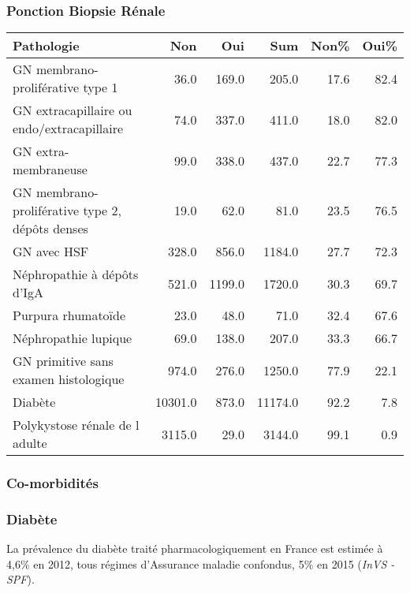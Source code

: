 \documentclass[11pt,a4paper]{article}\usepackage[]{graphicx}\usepackage[]{color}
\begin{document}
      \subsubsection{Ponction Biopsie Rénale}

\begin{table}[H]
\centering
\begin{tabular}{lrrrrr}
  \hline
Pathologie & Non & Oui & Sum & Non\% & Oui\% \\ 
  \hline
GN membrano-proliférative type 1 & 36.0 & 169.0 & 205.0 & 17.6 & 82.4 \\ 
  GN extracapillaire ou endo/extracapillaire & 74.0 & 337.0 & 411.0 & 18.0 & 82.0 \\ 
  GN extra-membraneuse & 99.0 & 338.0 & 437.0 & 22.7 & 77.3 \\ 
  GN membrano-proliférative type 2, dépôts denses & 19.0 & 62.0 & 81.0 & 23.5 & 76.5 \\ 
  GN avec HSF & 328.0 & 856.0 & 1184.0 & 27.7 & 72.3 \\ 
  Néphropathie à dépôts d'IgA & 521.0 & 1199.0 & 1720.0 & 30.3 & 69.7 \\ 
  Purpura rhumatoïde & 23.0 & 48.0 & 71.0 & 32.4 & 67.6 \\ 
  Néphropathie lupique & 69.0 & 138.0 & 207.0 & 33.3 & 66.7 \\ 
  GN primitive sans examen histologique & 974.0 & 276.0 & 1250.0 & 77.9 & 22.1 \\ 
  Diabète & 10301.0 & 873.0 & 11174.0 & 92.2 & 7.8 \\ 
  Polykystose rénale de l adulte & 3115.0 & 29.0 & 3144.0 & 99.1 & 0.9 \\ 
   \hline
\end{tabular}
\end{table}


      \subsubsection{Co-morbidités}

\subsubsection*{Diabète}

La prévalence du diabète traité pharmacologiquement en France est estimée à 4,6\% en 2012, tous régimes d’Assurance maladie confondus, 5\% en 2015 (\textit{InVS - SPF}).
\end{document}
